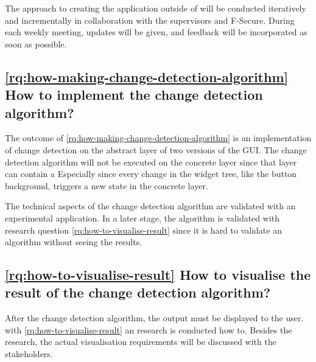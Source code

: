 The approach to creating the application outside of \testar will be conducted iteratively and incrementally in collaboration with the supervisors and F-Secure. During each weekly meeting, updates will be given, and feedback will be incorporated as soon as possible. 

\subsection{\ref{rq:how-making-change-detection-algorithm} How to implement the change detection algorithm?}

The outcome of \ref{rq:how-making-change-detection-algorithm} is an implementation of change detection on the abstract layer of two versions of the GUI. The change detection algorithm will not be executed on the concrete layer since that layer can contain a 
Especially since every change in the widget tree, like the button background, triggers a new state in the concrete layer. 

The technical aspects of the change detection algorithm are validated with an experimental application. In a later stage, the algorithm is validated with research question \ref{rq:how-to-visualise-result} since it is hard to validate an algorithm without seeing the results. 

\subsection{\ref{rq:how-to-visualise-result} How to visualise the result of the change detection algorithm?}

After the change detection algorithm, the output must be displayed to the user. with \ref{rq:how-to-visualise-result} an research is conducted how to. Besides the research, the actual visualisation requirements will be discussed with the \testar stakeholders.